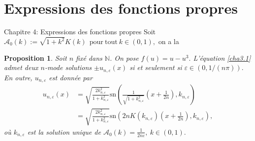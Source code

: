 \documentclass[mathserif,10pt]{beamer}
\newtheorem{proposition}{Proposition}
\begin{document}
\section{Expressions des fonctions propres }
\begin{frame}{}\transglitter[duration=1]
\begin{center}
\end{center}
\end{frame}
\begin{frame}{Chapitre 4: Expressions des fonctions propres }\transglitter[duration=1]
Soit $\mathcal{A}_{0}(k):=\sqrt{1+k^{2}}K(k) \ \ \mathrm{pour \ tout }  \  k\in (0,1),
$ on a la \pause
\begin{exampleblock}{}
\begin{proposition}\label{pro12}
Soit $n$ fixé dans $\mathbb{N}$. On pose $f(u)=u-u^{3}.$ 
L'équation  \eqref{cha3.1} admet deux $n$-mode solutions $\pm u_{n,\varepsilon}(x)$ si et seulement si $\varepsilon \in (0,1/(n\pi )).$ En outre, $ u_{n,\varepsilon }$ est donnée par
\begin{align}\label{eq4.1}
\nonumber
 u_{n,\varepsilon } (x)&= \sqrt{\frac{2k_{n,\varepsilon }^{2}}{1+k_{n,\varepsilon }^{2}}}\mathrm{sn}  \left(\frac{1}{\sqrt{1+k_{n,\varepsilon }^{2}}}\left( x+\frac{1}{2n}\right) ,k_{n,\varepsilon } \right)\\
&=  \sqrt{\frac{2k_{n,\varepsilon }^{2}}{1+k_{n,\varepsilon }^{2}}}\mathrm{sn}   \left(2nK(k_{n,\varepsilon }) \left( x+\frac{1}{2n}\right) ,k_{n,\varepsilon } \right), 
\end{align}
où $k_{n,\varepsilon }$ est la solution unique de 
$
\mathcal{A}_{0}(k)=\frac{1}{2n\varepsilon }, \  k \in (0,1).
$
\end{proposition}
\end{exampleblock}
\end{frame}
\end{document}
